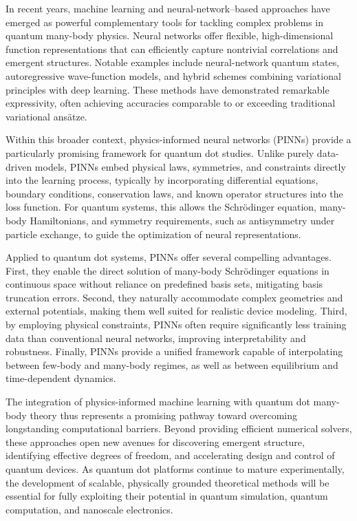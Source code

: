 \documentclass[superscriptaddress,unsortedaddress,amsmath,amssymb,aps]{revtex4-2}
\begin{document}
In recent years, machine learning and neural-network–based approaches
have emerged as powerful complementary tools for tackling complex
problems in quantum many-body physics. Neural networks offer flexible,
high-dimensional function representations that can efficiently capture
nontrivial correlations and emergent structures. Notable examples
include neural-network quantum states, autoregressive wave-function
models, and hybrid schemes combining variational principles with deep
learning. These methods have demonstrated remarkable expressivity,
often achieving accuracies comparable to or exceeding traditional
variational ansätze.

Within this broader context, physics-informed neural networks (PINNs)
provide a particularly promising framework for quantum dot
studies. Unlike purely data-driven models, PINNs embed physical laws,
symmetries, and constraints directly into the learning process,
typically by incorporating differential equations, boundary
conditions, conservation laws, and known operator structures into the
loss function. For quantum systems, this allows the Schrödinger
equation, many-body Hamiltonians, and symmetry requirements, such as
antisymmetry under particle exchange, to guide the optimization of
neural representations.

Applied to quantum dot systems, PINNs offer several compelling
advantages. First, they enable the direct solution of many-body
Schrödinger equations in continuous space without reliance on
predefined basis sets, mitigating basis truncation errors. Second,
they naturally accommodate complex geometries and external potentials,
making them well suited for realistic device modeling. Third, by
employing physical constraints, PINNs often require significantly
less training data than conventional neural networks, improving
interpretability and robustness. Finally, PINNs provide a unified
framework capable of interpolating between few-body and many-body
regimes, as well as between equilibrium and time-dependent dynamics.

The integration of physics-informed machine learning with quantum dot
many-body theory thus represents a promising pathway toward overcoming
longstanding computational barriers. Beyond providing efficient
numerical solvers, these approaches open new avenues for discovering
emergent structure, identifying effective degrees of freedom, and
accelerating design and control of quantum devices. As quantum dot
platforms continue to mature experimentally, the development of
scalable, physically grounded theoretical methods will be essential
for fully exploiting their potential in quantum simulation, quantum
computation, and nanoscale electronics.
\end{document}
